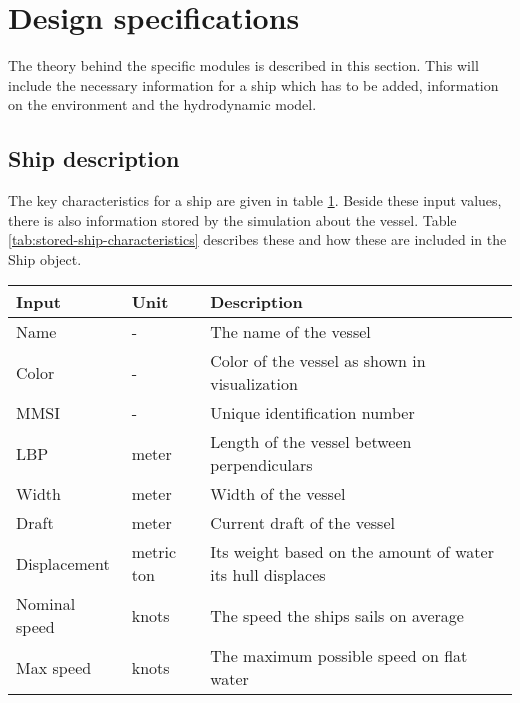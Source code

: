 \section{Design specifications}
The theory behind the specific modules is described in this section. This will include the necessary information for a ship which has to be added, information on the environment and the hydrodynamic model.

\subsection{Ship description}
The key characteristics for a ship are given in table \ref{tab:input-ship-characteristics}. Beside these input values, there is also information stored by the simulation about the vessel. Table \ref{tab:stored-ship-characteristics} describes these and how these are included in the Ship object.

\begin{table}[H]
	\centering
	\begin{tabular}{p{}|p{}|p{}}
		\toprule
		Input & Unit & Description\\
		\midrule
		Name & - & The name of the vessel\\
		Color & - & Color of the vessel as shown in visualization \\
		MMSI & - & Unique identification number \\
		LBP & meter & Length of the vessel between perpendiculars \\
		Width & meter & Width of the vessel \\
		Draft & meter & Current draft of the vessel\\
		Displacement & metric ton & Its weight based on the amount of water its hull displaces\\
		Nominal speed & knots & The speed the ships sails on average \\
		Max speed & knots & The maximum possible speed on flat water \\
		\bottomrule
	\end{tabular}
	
	\label{tab:input-ship-characteristics}
\end{table}

